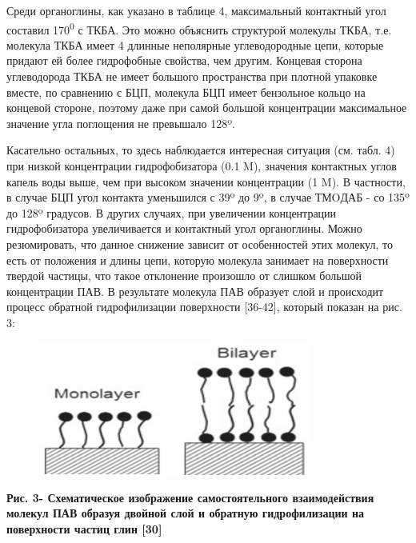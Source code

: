 Среди органоглины, как указано в таблице 4, максимальный контактный угол
составил 170\textsuperscript{0} с ТКБА. Это можно объяснить структурой
молекулы ТКБА, т.е. молекула ТКБА имеет 4 длинные неполярные
углеводородные цепи, которые придают ей более гидрофобные свойства, чем
другим. Концевая сторона углеводорода ТКБА не имеет большого
пространства при плотной упаковке вместе, по сравнению с БЦП, молекула
БЦП имеет бензольное кольцо на концевой стороне, поэтому даже при самой
большой концентрации максимальное значение угла поглощения не превышало
128º.

Касательно остальных, то здесь наблюдается интересная ситуация (см.
табл. 4) при низкой концентрации гидрофобизатора (0.1 M), значения
контактных углов капель воды выше, чем при высоком значении концентрации
(1 M). В частности, в случае БЦП угол контакта уменьшился с 39º до 9º, в
случае ТМOДАБ - со 135º до 128º градусов. В других случаях, при
увеличении концентрации гидрофобизатора увеличивается и контактный угол
органоглины. Можно резюмировать, что данное снижение зависит от
особенностей этих молекул, то есть от положения и длины цепи, которую
молекула занимает на поверхности твердой частицы, что такое отклонение
произошло от слишком большой концентрации ПАВ. В результате молекула ПАВ
образует слой и происходит процесс обратной гидрофилизации поверхности
{[}36-42{]}, который показан на рис. 3:

\begin{figure}[H]
	\centering
	\includegraphics[width=0.8\textwidth]{assets/1027}
	\caption*{}
\end{figure}

\textbf{Рис. 3- Схематическое изображение самостоятельного
взаимодействия молекул ПАВ образуя двойной слой и обратную
гидрофилизации на поверхности частиц глин {[}30{]}}

